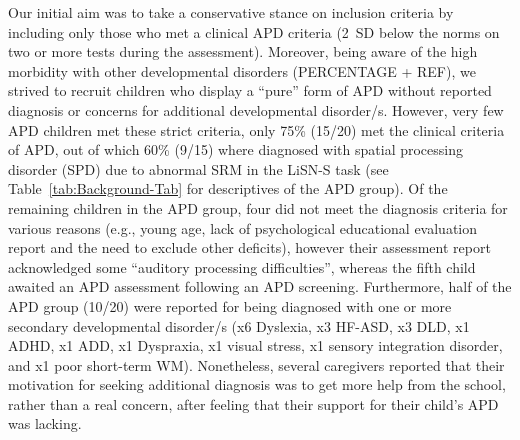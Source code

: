 \documentclass[a4paper, twoside]{templates/ociamthesis}
\begin{document}
Our initial aim was to take a conservative stance on inclusion criteria by including only those who met a clinical APD criteria (2~SD below the norms on two or more tests during the assessment). Moreover, being aware of the high morbidity with other developmental disorders (PERCENTAGE + REF), we strived to recruit children who display a ``pure'' form of APD without reported diagnosis or concerns for additional developmental disorder/s. However, very few APD children met these strict criteria, only 75\% (15/20) met the clinical criteria of APD, out of which 60\% (9/15) where diagnosed with spatial processing disorder (SPD) due to abnormal SRM in the LiSN-S task (see Table~\ref{tab:Background-Tab} for descriptives of the APD group). Of the remaining children in the APD group, four did not meet the diagnosis criteria for various reasons (e.g., young age, lack of psychological educational evaluation report and the need to exclude other deficits), however their assessment report acknowledged some ``auditory processing difficulties'', whereas the fifth child awaited an APD assessment following an APD screening. Furthermore, half of the APD group (10/20) were reported for being diagnosed with one or more secondary developmental disorder/s (x6 Dyslexia, x3 HF-ASD, x3 DLD, x1 ADHD, x1 ADD, x1 Dyspraxia, x1 visual stress, x1 sensory integration disorder, and x1 poor short-term WM). Nonetheless, several caregivers reported that their motivation for seeking additional diagnosis was to get more help from the school, rather than a real concern, after feeling that their support for their child's APD was lacking.\\
\end{document}
